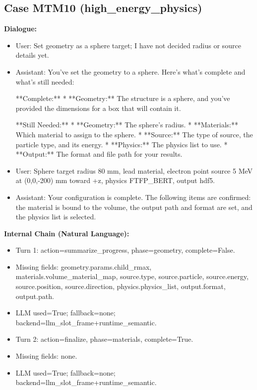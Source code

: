\documentclass[11pt]{ctexart}
\begin{document}
\subsection{Case MTM10 (high\_energy\_physics)}
\textbf{Dialogue:}
\begin{itemize}
\item User: Set geometry as a sphere target; I have not decided radius or source details yet.
\item Assistant: You've set the geometry to a sphere. Here's what's complete and what's still needed:

**Complete:**
*   **Geometry:** The structure is a sphere, and you've provided the dimensions for a box that will contain it.

**Still Needed:**
*   **Geometry:** The sphere's radius.
*   **Materials:** Which material to assign to the sphere.
*   **Source:** The type of source, the particle type, and its energy.
*   **Physics:** The physics list to use.
*   **Output:** The format and file path for your results.
\item User: Sphere target radius 80 mm, lead material, electron point source 5 MeV at (0,0,-200) mm toward +z, physics FTFP\_BERT, output hdf5.
\item Assistant: Your configuration is complete. The following items are confirmed: the material is bound to the volume, the output path and format are set, and the physics list is selected.
\end{itemize}
\textbf{Internal Chain (Natural Language):}
\begin{itemize}
\item Turn 1: action=summarize\_progress, phase=geometry, complete=False.
\item Missing fields: geometry.params.child\_rmax, materials.volume\_material\_map, source.type, source.particle, source.energy, source.position, source.direction, physics.physics\_list, output.format, output.path.
\item LLM used=True; fallback=none; backend=llm\_slot\_frame+runtime\_semantic.
\item Turn 2: action=finalize, phase=materials, complete=True.
\item Missing fields: none.
\item LLM used=True; fallback=none; backend=llm\_slot\_frame+runtime\_semantic.
\end{itemize}
\end{document}

